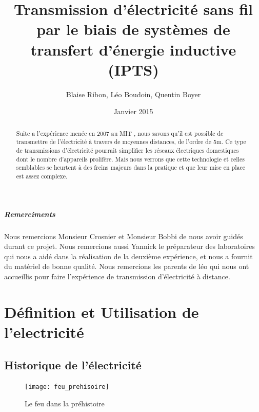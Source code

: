 \documentclass[12pt]{report}
\begin{document}

\title{Transmission d'électricité sans fil par le biais de systèmes de transfert d'énergie inductive (IPTS)}
\author{Blaise Ribon, Léo Boudoin, Quentin Boyer}
\date{Janvier 2015}
\maketitle

\begin{abstract}
	Suite a l'expérience menée en 2007 au MIT , nous savons qu'il est possible de transmettre de l'électricité à travers de moyennes distances, de l'ordre de 5m. Ce type de transmissions d'électricité pourrait simplifier les réseaux électriques domestiques dont le nombre d'appareils prolifère. Mais nous verrons que cette technologie et celles semblables se heurtent à des freins majeurs dans la pratique et que leur mise en place est assez complexe.
\end{abstract}

\tableofcontents

\paragraph{Remerciments}
Nous remercions Monsieur Crosnier et Monsieur Bobbi de nous avoir guidés durant ce projet. Nous remercions aussi Yannick le préparateur des laboratoires qui nous a aidé dans la réalisation de la deuxième expérience, et nous a fournit du matériel de bonne qualité. Nous remercions les parents de léo qui nous ont accueillis pour faire l'expérience de transmission d'électricité à distance.

\chapter{Définition et Utilisation de l'electricité} %
\section{Historique de l'électricité}

\begin{figure}[h!]
  \caption{Le feu dans la préhistoire}
  \centering
	\texttt{[image: feu\_prehisoire]}
\end{figure}
\end{document}
